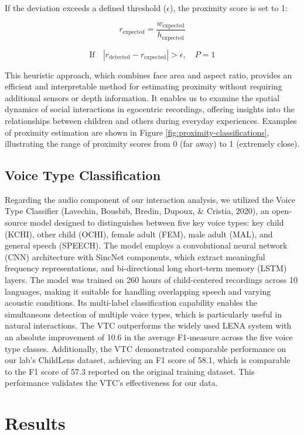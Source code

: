 \documentclass[
  man,floatsintext]{apa6}
\begin{document}
If the deviation exceeds a defined threshold (\(\epsilon\)), the proximity score is set to 1:

\[
r_{\text{expected}} = \frac{w_{\text{expected}}}{h_{\text{expected}}}
\]

\[
\text{If} \quad |r_{\text{detected}} - r_{\text{expected}}| > \epsilon, \quad P = 1
\]

This heuristic approach, which combines face area and aspect ratio, provides an efficient and interpretable method for estimating proximity without requiring additional sensors or depth information. It enables us to examine the spatial dynamics of social interactions in egocentric recordings, offering insights into the relationships between children and others during everyday experiences. Examples of proximity estimation are shown in Figure \ref{fig:proximity-classifications}, illustrating the range of proximity scores from 0 (far away) to 1 (extremely close).

\subsection{Voice Type Classification}\label{voice-type}

Regarding the audio component of our interaction analysis, we utilized the Voice Type Classifier (Lavechin, Bousbib, Bredin, Dupoux, \& Cristia, 2020), an open-source model designed to distinguishes between five key voice types: key child (KCHI), other child (OCHI), female adult (FEM), male adult (MAL), and general speech (SPEECH). The model employs a convolutional neural network (CNN) architecture with SincNet components, which extract meaningful frequency representations, and bi-directional long short-term memory (LSTM) layers. The model was trained on 260 hours of child-centered recordings across 10 languages, making it suitable for handling overlapping speech and varying acoustic conditions. Its multi-label classification capability enables the simultaneous detection of multiple voice types, which is particularly useful in natural interactions. The VTC outperforms the widely used LENA system with an absolute improvement of 10.6 in the average F1-measure across the five voice type classes. Additionally, the VTC demonstrated comparable performance on our lab's ChildLens dataset, achieving an F1 score of 58.1, which is comparable to the F1 score of 57.3 reported on the original training dataset. This performance validates the VTC's effectiveness for our data.

\section{Results}\label{results}
\end{document}
